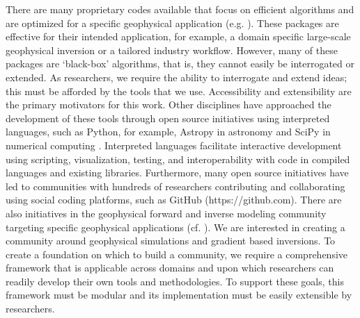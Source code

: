 \documentclass[preprint,review,3p,times,onecolumn,authoryear]{elsarticle}
\begin{document}
There are many proprietary codes available that focus on efficient algorithms and are optimized for a specific geophysical application (e.g. \cite{Kelbert2014a, Key2007, liol96, Li1998a}). These packages are effective for their intended application, for example, a domain specific large-scale geophysical inversion or a tailored industry workflow. However, many of these packages are `black-box' algorithms, that is, they cannot easily be interrogated or extended. As researchers, we require the ability to interrogate and extend ideas; this must be afforded by the tools that we use.
Accessibility and extensibility are the primary motivators for this work.
Other disciplines have approached the development of these tools through open source initiatives using interpreted languages, such as Python, for example, Astropy in astronomy \citep{Astropy} and SciPy in numerical computing \citep{scipy}. Interpreted languages facilitate interactive development using scripting, visualization, testing, and interoperability with code in compiled languages and existing libraries. Furthermore, many open source initiatives have led to communities with hundreds of researchers contributing and collaborating using social coding platforms, such as GitHub (https://github.com). There are also initiatives in the geophysical forward and inverse modeling community targeting specific geophysical applications (cf. \cite{Hansen2013, PySIT2013, Uieda2014, Kelbert2014a, Modflow}). We are interested in creating a community around geophysical simulations and gradient based inversions. To create a foundation on which to build a community, we require a comprehensive framework that is applicable across domains and upon which researchers can readily develop their own tools and methodologies. To support these goals, this framework must be modular and its implementation must be easily extensible by researchers.
\end{document}
